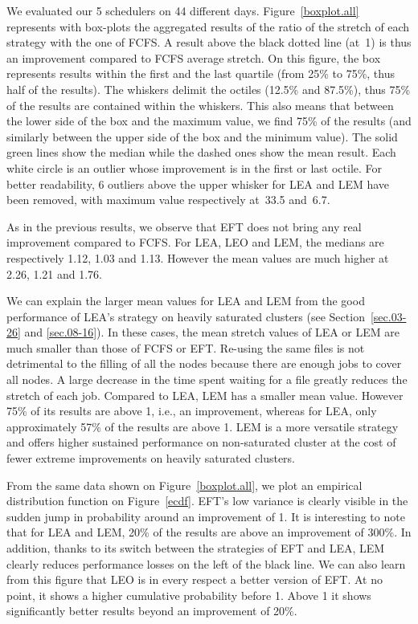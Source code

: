 \documentclass[conference,10pt]{IEEEtran}
\begin{document}
We evaluated our 5 schedulers on 44 different days.
Figure~\ref{boxplot.all} represents with box-plots the aggregated
results of the ratio of the stretch of each strategy with the one of FCFS. A result above the black dotted line (at~1) is thus an improvement compared to FCFS average stretch.
On this figure, the box represents results within the first and the last quartile (from 25\% to 75\%, thus half of the results).
The whiskers delimit the octiles (12.5\% and 87.5\%), thus 75\% of the results are contained
within the whiskers. This also means that between the lower side of the box and the maximum value,
we find 75\% of the results (and similarly between the upper side of the box and the minimum value).
The solid green lines show the median while the dashed ones show the mean result.
Each white circle is an outlier whose improvement is in the first or last octile.
For better readability, 6 outliers above the upper whisker for LEA and
LEM have been removed, with maximum value respectively at~33.5
and~6.7.

As in the previous results, we observe that EFT does not bring any real improvement compared to FCFS.
For LEA, LEO and LEM, the medians are respectively 1.12, 1.03 and 1.13. 
However the mean values are much higher at 2.26, 1.21 and 1.76.

We can explain the larger mean values for LEA and LEM from the good performance of LEA's strategy
on heavily saturated clusters (see Section~\ref{sec.03-26} and \ref{sec.08-16}).
In these cases, the mean stretch values of LEA or LEM are much smaller than those of FCFS or EFT.
Re-using the same files is not detrimental to the filling of all the nodes because there are 
enough jobs to cover all nodes.
A large decrease in the time spent waiting for a file greatly reduces the stretch of each job.
Compared to LEA, LEM has a smaller mean value.
However 75\% of its results are above 1, i.e., an improvement, whereas for LEA, only approximately 57\% of the results are above 1. 
LEM is a more versatile strategy and offers higher sustained performance on non-saturated cluster at the cost
of fewer extreme improvements on heavily saturated clusters.


From the same data shown on Figure~\ref{boxplot.all}, we plot an empirical distribution function on Figure~\ref{ecdf}.
EFT's low variance is clearly visible in the sudden jump in probability around an improvement of 1.
It is interesting to note that for LEA and LEM, 20\% of the results are above an improvement of 300\%.
In addition, thanks to its switch between the strategies of EFT and LEA, LEM clearly reduces
performance losses on the left of the black line.
We can also learn from this figure that LEO is in every respect a better version of EFT.
At no point, it shows a higher cumulative probability before 1. Above 1 it shows significantly better
results beyond an improvement of 20\%.
\end{document}
